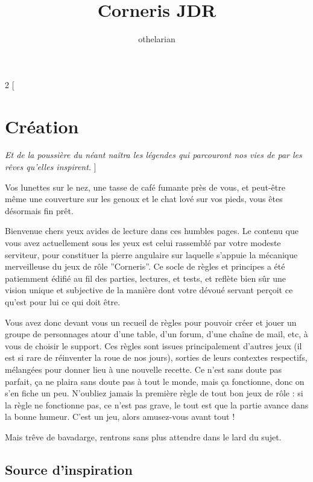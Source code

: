 \documentclass[11pt,oneside]{book}
\title{Corneris JDR}
\author{othelarian}
\date{}
\begin{document}
\maketitle

\tableofcontents

\begin{multicols}{2}
    [    
        \chapter{Création}
        \linebreak
        \emph{Et de la poussière du néant naîtra les légendes qui parcouront nos vies de par les rêves qu'elles inspirent.}
    ]

    Vos lunettes sur le nez, une tasse de café fumante près de vous, et peut-être même une couverture sur les genoux et le chat lové sur vos pieds, vous êtes désormais fin prêt.

    Bienvenue chers yeux avides de lecture dans ces humbles pages. Le contenu que vous avez actuellement sous les yeux est celui rassemblé par votre modeste serviteur, pour constituer la pierre angulaire sur laquelle s'appuie la mécanique merveilleuse du jeux de rôle ''Corneris''. Ce socle de règles et principes a été patiemment édifié au fil des parties, lectures, et tests, et reflète bien sûr une vision unique et subjective de la manière dont votre dévoué servant perçoit ce qu'est pour lui ce qui doit être.

    Vous avez donc devant vous un recueil de règles pour pouvoir créer et jouer un groupe de personnages atour d'une table, d'un forum, d'une chaîne de mail, etc, à vous de choisir le support. Ces règles sont issues principalement d'autres jeux (il est si rare de réinventer la roue de nos jours), sorties de leurs contextes respectifs, mélangées pour donner lieu à une nouvelle recette. Ce n'est sans doute pas parfait, ça ne plaira sans doute pas à tout le monde, mais ça fonctionne, donc on s'en fiche un peu. N'oubliez jamais la première règle de tout bon jeux de rôle : si la règle ne fonctionne pas, ce n'est pas grave, le tout est que la partie avance dans la bonne humeur. C'est un jeu, alors amusez-vous avant tout !

    Mais trêve de bavadarge, rentrons sans plus attendre dans le lard du sujet.

    \section{Source d'inspiration}


\end{multicols}
\end{document}
